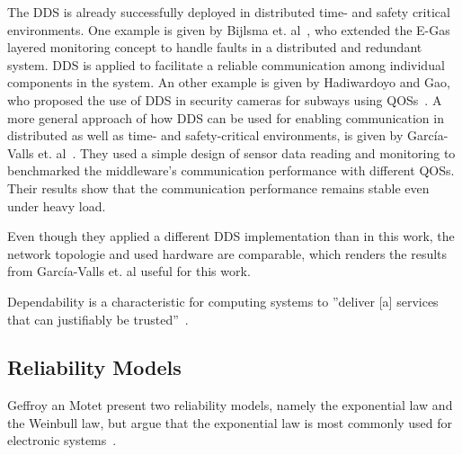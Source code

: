 The \gls*{DDS} is already successfully deployed in distributed time- and safety critical environments.
One example is given by Bijlsma et. al~\cite{DistributedSafety2020}, who extended the E-Gas layered monitoring concept to handle faults in a distributed and redundant system.
\Gls*{DDS} is applied to facilitate a reliable communication among individual components in the system.
An other example is given by Hadiwardoyo and Gao, who proposed the use of \gls*{DDS} in security cameras for subways using \glspl*{QOS}~\cite{DDSInSubways}.
A more general approach of how \gls*{DDS} can be used for enabling communication in distributed as well as time- and safety-critical environments, is given by García-Valls et. al~\cite{GarciaVallsDDSInDistributed}.
They used a simple design of sensor data reading and monitoring to benchmarked the middleware's communication performance with different \glspl*{QOS}.
Their results show that the communication performance remains stable even under heavy load.

Even though they applied a different \gls*{DDS} implementation than in this work, the network topologie and used hardware are comparable, which renders the results from García-Valls et. al useful for this work.











































\iffalse

Dependability is a characteristic for computing systems to ''deliver [a] services that can justifiably be trusted''~\cite{AvizienisDependability2001}.


\subsection{Reliability Models}
Geffroy an Motet present two reliability models, namely the exponential law and the Weinbull law, but argue that the exponential law is most commonly used for electronic systems~\cite{GeffroyMotetDependableComputing}.

